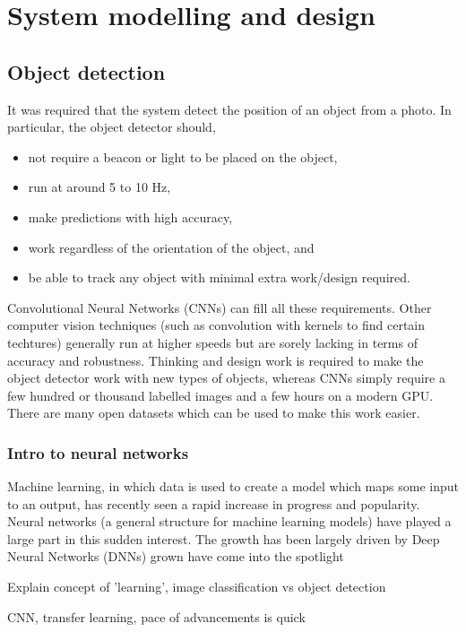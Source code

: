 \section{System modelling and design}

\subsection{Object detection}
It was required that the system detect the position of an object from a photo. In particular, the object detector should,

\begin{itemize}
	\item not require a beacon or light to be placed on the object,
	\item run at around 5 to 10 Hz,
	\item make predictions with high accuracy,
	\item work regardless of the orientation of the object, and
	\item be able to track any object with minimal extra work/design required.
\end{itemize}

Convolutional Neural Networks (CNNs) can fill all these requirements. Other computer vision techniques (such as convolution with kernels to find certain techtures) generally run at higher speeds but are sorely lacking in terms of accuracy and robustness. Thinking and design work is required to make the object detector work with new types of objects, whereas CNNs simply require a few hundred or thousand labelled images and a few hours on a modern GPU. There are many open datasets which can be used to make this work easier.

\subsubsection{Intro to neural networks}
Machine learning, in which data is used to create a model which maps some input to an output, has recently seen a rapid increase in progress and popularity. Neural networks (a general structure for machine learning models) have played a large part in this sudden interest. The growth has been largely driven by Deep Neural Networks (DNNs) grown have come into the spotlight 

Explain concept of 'learning', image classification vs object detection

CNN, transfer learning, pace of advancements is quick

